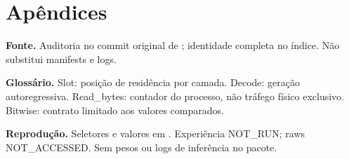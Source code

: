 \section{Apêndices}
\textbf{Fonte.} Auditoria  no commit original de ; identidade completa no índice. Não substitui manifests e logs.

\textbf{Glossário.} Slot: posição de residência por camada. Decode: geração autoregressiva. Read\_bytes: contador do processo, não tráfego físico exclusivo. Bitwise: contrato limitado aos valores comparados.

\textbf{Reprodução.} Seletores e valores em . Experiência NOT\_RUN; raws NOT\_ACCESSED. Sem pesos ou logs de inferência no pacote.
